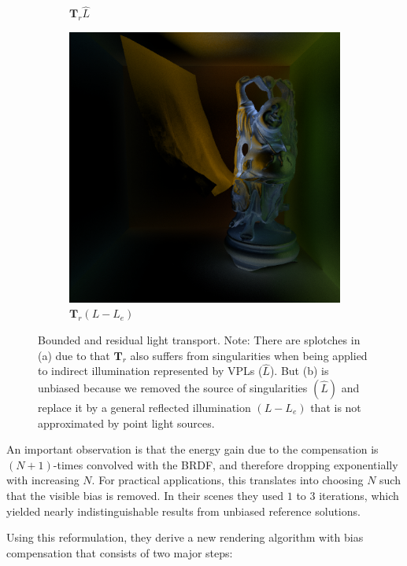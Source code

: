 \begin{figure}
\begin{center}
\begin{subfigure}[b]{0.195\textwidth}
		\caption{$\mathbf{T}_r\hat{L}$}
	\end{subfigure}
	\begin{subfigure}[b]{0.195\textwidth}
		\includegraphics[width=1.0\textwidth]{graphics/ir/ir-7-6}
		\caption{$\mathbf{T}_r(L-L_e)$}
	\end{subfigure}
\end{center}
\caption{Bounded and residual light transport. Note: There are splotches in (a) due to that $\mathbf{T}_r$ also suffers from singularities when being applied to indirect illumination represented by VPLs ($\hat{L}$). But (b) is unbiased because we removed the source of singularities $(\hat{L})$ and replace it by a general reflected illumination $(L-L_e)$ that is not approximated by point light sources.}
\end{figure}

An important observation is that the energy gain due to the compensation is $(N+1)$-times convolved with the BRDF, and therefore dropping exponentially with increasing $N$. For practical applications, this translates into choosing $N$ such that the visible bias is removed. In their scenes they used $1$ to $3$ iterations, which yielded nearly indistinguishable results from unbiased reference solutions.

Using this reformulation, they derive a new rendering algorithm with bias compensation that consists of two major steps:


